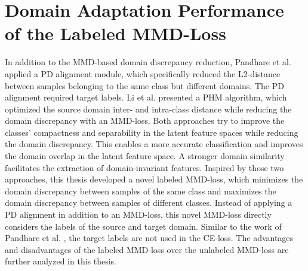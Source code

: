 \section{Domain Adaptation Performance of the Labeled MMD-Loss}
In addition to the MMD-based domain discrepancy reduction, Pandhare et al. \cite{Pandhare2021} applied a PD alignment module, which specifically reduced the L2-distance between samples belonging to the same class but different domains. The PD alignment required target labels. Li et al. \cite{Li2018} presented a PHM algorithm, which optimized the source domain inter- and intra-class distance while reducing the domain discrepancy with an MMD-loss. Both approaches try to improve the classes' compactness and separability in the latent feature spaces while reducing the domain discrepancy. This enables a more accurate classification and improves the domain overlap in the latent feature space. A stronger domain similarity facilitates the extraction of domain-invariant features. Inspired by those two approaches, this thesis developed a novel labeled MMD-loss, which minimizes the domain discrepancy between samples of the same class and maximizes the domain discrepancy between samples of different classes. Instead of applying a PD alignment in addition to an MMD-loss, this novel MMD-loss directly considers the labels of the source and target domain. Similar to the work of Pandhare et al. \cite{Pandhare2021}, the target labels are not used in the CE-loss. The advantages and disadvantages of the labeled MMD-loss over the unlabeled MMD-loss are further analyzed in this thesis.

